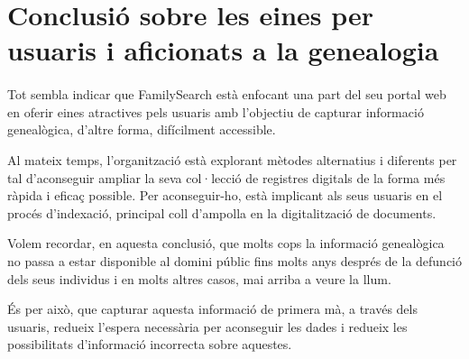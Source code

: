 \section{Conclusió sobre les eines per usuaris i aficionats a la genealogia}

    \paragraph{}
    Tot sembla indicar que  FamilySearch està enfocant una part del seu portal web en oferir eines atractives pels usuaris amb l'objectiu de capturar informació genealògica, d'altre forma, difícilment accessible.

    Al mateix temps, l’organització està explorant mètodes alternatius i diferents per tal d’aconseguir ampliar la seva col·lecció de registres digitals de la forma més ràpida i eficaç possible. Per aconseguir-ho, està implicant als seus usuaris en el procés d’indexació, principal coll d'ampolla en la digitalització de documents.

    Volem recordar, en aquesta conclusió, que molts cops la informació genealògica no passa a estar disponible al domini públic fins molts anys després de la defunció dels seus individus i en molts altres casos, mai arriba a veure la llum.

    És per això, que capturar aquesta informació de primera mà, a través dels usuaris, redueix l'espera necessària per aconseguir les dades i redueix les possibilitats d'informació incorrecta sobre aquestes.
